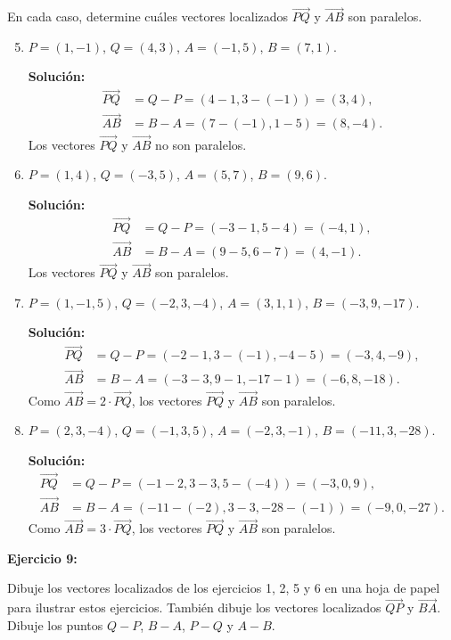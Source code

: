 En cada caso, determine cuáles vectores localizados $\overrightarrow{PQ}$ y $\overrightarrow{AB}$ son paralelos.

\begin{enumerate}
    \setcounter{enumi}{4}
    \item $P = (1, -1)$, $Q = (4, 3)$, $A = (-1, 5)$, $B = (7, 1)$.
    
    \textbf{Solución:}
    \begin{align*}
        \overrightarrow{PQ} &= Q - P = (4 - 1, 3 - (-1)) = (3, 4), \\
        \overrightarrow{AB} &= B - A = (7 - (-1), 1 - 5) = (8, -4).
    \end{align*}
    Los vectores $\overrightarrow{PQ}$ y $\overrightarrow{AB}$ no son paralelos.

    \item $P = (1, 4)$, $Q = (-3, 5)$, $A = (5, 7)$, $B = (9, 6)$.
    
    \textbf{Solución:}
    \begin{align*}
        \overrightarrow{PQ} &= Q - P = (-3 - 1, 5 - 4) = (-4, 1), \\
        \overrightarrow{AB} &= B - A = (9 - 5, 6 - 7) = (4, -1).
    \end{align*}
    Los vectores $\overrightarrow{PQ}$ y $\overrightarrow{AB}$ son paralelos.

    \item $P = (1, -1, 5)$, $Q = (-2, 3, -4)$, $A = (3, 1, 1)$, $B = (-3, 9, -17)$.
    
    \textbf{Solución:}
    \begin{align*}
        \overrightarrow{PQ} &= Q - P = (-2 - 1, 3 - (-1), -4 - 5) = (-3, 4, -9), \\
        \overrightarrow{AB} &= B - A = (-3 - 3, 9 - 1, -17 - 1) = (-6, 8, -18).
    \end{align*}
    Como $\overrightarrow{AB} = 2 \cdot \overrightarrow{PQ}$, los vectores $\overrightarrow{PQ}$ y $\overrightarrow{AB}$ son paralelos.

    \item $P = (2, 3, -4)$, $Q = (-1, 3, 5)$, $A = (-2, 3, -1)$, $B = (-11, 3, -28)$.
    
    \textbf{Solución:}
    \begin{align*}
        \overrightarrow{PQ} &= Q - P = (-1 - 2, 3 - 3, 5 - (-4)) = (-3, 0, 9), \\
        \overrightarrow{AB} &= B - A = (-11 - (-2), 3 - 3, -28 - (-1)) = (-9, 0, -27).
    \end{align*}
    Como $\overrightarrow{AB} = 3 \cdot \overrightarrow{PQ}$, los vectores $\overrightarrow{PQ}$ y $\overrightarrow{AB}$ son paralelos.
\end{enumerate}

\textbf{Ejercicio 9:}

Dibuje los vectores localizados de los ejercicios 1, 2, 5 y 6 en una hoja de papel para ilustrar estos ejercicios. También dibuje los vectores localizados $\overrightarrow{QP}$ y $\overrightarrow{BA}$. Dibuje los puntos $Q - P$, $B - A$, $P - Q$ y $A - B$.